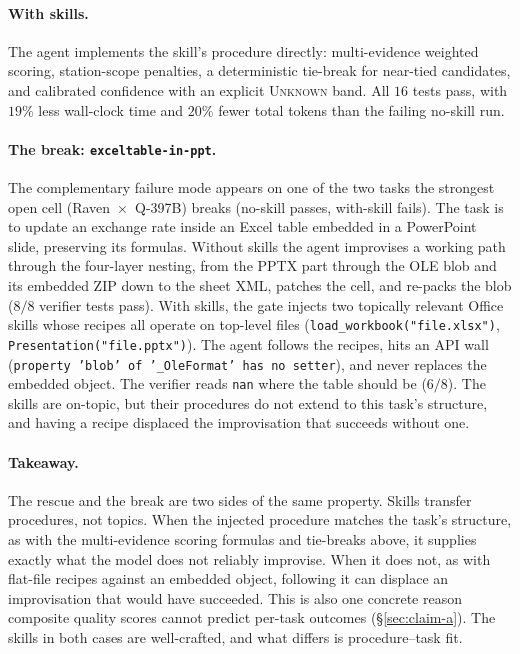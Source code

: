 \paragraph{With skills.}
The agent implements the skill's procedure directly:
multi-evidence weighted scoring, station-scope penalties, a
deterministic tie-break for near-tied candidates, and
calibrated confidence with an explicit \textsc{Unknown} band.
All $16$ tests pass, with $19\%$ less wall-clock time and
$20\%$ fewer total tokens than the failing no-skill run.

\paragraph{The break: \texttt{exceltable-in-ppt}.}
The complementary failure mode appears on one of the two tasks
the strongest open cell (Raven~$\times$~Q-397B) breaks
(no-skill passes, with-skill fails).  The task is to update an
exchange rate inside an Excel table embedded in a
PowerPoint slide, preserving its formulas.  Without skills the
agent improvises a working path through the four-layer
nesting, from the PPTX part through the OLE blob and its
embedded ZIP down to the sheet XML, patches the cell, and
re-packs the blob ($8/8$ verifier
tests pass).  With skills, the gate injects two topically
relevant Office skills whose recipes all operate on
top-level files
(\texttt{load\_workbook("file.xlsx")},
\texttt{Presentation("file.pptx")}).  The agent follows the
recipes, hits an API wall
(\texttt{property 'blob' of '\_OleFormat' has no setter}), and
never replaces the embedded object.  The verifier reads
\texttt{nan} where the table should be ($6/8$).  The skills are
on-topic, but their procedures do not extend to this task's
structure, and having a recipe displaced the improvisation that
succeeds without one.

\paragraph{Takeaway.}
The rescue and the break are two sides of the same property.
Skills transfer procedures, not topics.  When the
injected procedure matches the task's structure, as with the
multi-evidence scoring formulas and tie-breaks above, it
supplies exactly what the model does not reliably improvise.
When it does not, as with flat-file recipes against an embedded
object, following it can displace an improvisation that would
have succeeded.  This
is also one concrete reason composite quality scores cannot
predict per-task outcomes (\S\ref{sec:claim-a}).  The skills in
both cases are well-crafted, and what differs is
procedure--task fit.

